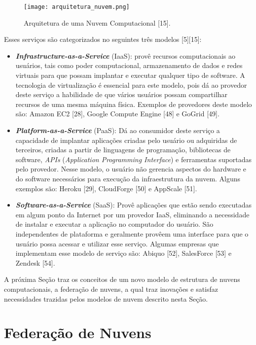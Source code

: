 \begin{figure}[H]
	\centering
	\texttt{[image: arquitetura\_nuvem.png]}
	\caption{Arquitetura de uma Nuvem Computacional [15].}
	\label{fig:cloud_architecture}
\end{figure}

Esses serviços são categorizados no seguintes três modelos \cite{cloud_360}[5][15]: 

\begin{itemize}
	\item \textbf{\textit{Infrastructure-as-a-Service}} (IaaS): provê recursos computacionais ao usuários, tais como poder computacional, armazenamento de dados e redes virtuais para que possam implantar e executar qualquer tipo de software. A tecnologia de virtualização é essencial para este modelo, pois dá ao provedor deste serviço a habilidade de que vários usuários possam compartilhar recursos de uma mesma máquina física. Exemplos de provedores deste modelo são: Amazon EC2 [28], Google Compute Engine [48] e GoGrid [49].
	\item \textit{\textbf{Platform-as-a-Service}} (PaaS): Dá ao consumidor deste serviço a capacidade de implantar aplicações criadas pelo usuário ou adquiridas de terceiros, criadas a partir de linguagens de programação, bibliotecas de software, \textit{APIs} (\textit{Application Programming Interface}) e ferramentas suportadas pelo provedor. Nesse modelo, o usuário não gerencia aspectos do hardware e do software necessários para execução da infraestrutura da nuvem. Alguns exemplos são: Heroku [29], CloudForge [50] e AppScale [51].
	\item \textit{\textbf{Software-as-a-Service}} (SaaS): Provê aplicações que estão sendo executadas em algum ponto da Internet por um provedor IaaS, eliminando a necessidade de instalar e executar a aplicação no computador do usuário. São independentes de plataforma e geralmente provêem uma interface para que o usuário possa acessar e utilizar esse serviço. Algumas empresas que implementam esse modelo de serviço são: Abiquo [52], SalesForce [53] e Zendesk [54]. 
\end{itemize}

A próxima Seção traz os conceitos de um novo modelo de estrutura de nuvens computacionais, a federação de nuvens, a qual traz inovações e satisfaz necessidades trazidas pelos modelos de nuvem descrito nesta Seção. 

\section{Federação de Nuvens} \label{cap2sec3}

